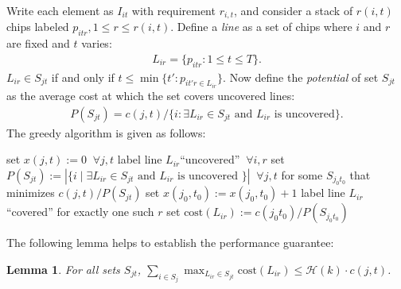 \documentclass[a4paper,11pt]{article}
\newtheorem{lemma}[theorem]{Lemma}
\begin{document}
Write each element as $I_{it}$ with requirement $r_{i, t}$, and consider a stack of $r(i, t)$ chips labeled $p_{itr}, 1 \leq r \leq r(i, t)$. Define a \emph{line} as a set of chips where $i$ and $r$ are fixed and $t$ varies:
\begin{align*}
    L_{ir} = \{ p_{itr} : 1 \leq t \leq T \}.
\end{align*}
$L_{ir} \in S_{jt}$ if and only if $t \leq \min\{ t' : p_{it'r \in L_{ir}} \}$. Now define the \emph{potential} of set $S_{jt}$ as the average cost at which the set covers uncovered lines:
\begin{align*}
    P(S_{jt}) = c(j, t) / \{ i : \exists L_{ir} \in S_{jt} \text{ and } L_{ir} \text{ is uncovered} \}.
\end{align*}
The greedy algorithm is given as follows:
\begin{algorithm}[H] {\begin{algorithmic}[1]
        \State set $x(j, t) := 0 \;\; \forall j, t$
        \State label line $L_{ir} \text{``uncovered''} \;\; \forall i, r$
            \State set $P(S_{jt}) := |\{ i \mid \exists L_{ir} \in S_{jt} \text{ and } L_{ir} \text{ is uncovered }\}| \;\; \forall j, t$
            \State for some $S_{j_0 t_0}$ that minimizes $c(j, t) / P(S_{jt})$ set $x(j_0, t_0) := x(j_0, t_0) + 1$
                    \State label line $L_{ir}$ ``covered'' for exactly one such $r$
                \EndIf
                \State set $\text{cost}(L_{ir}) := c(j_0 t_0) / P(S_{j_0 t_0})$
            \EndFor
        \EndWhile
\end{algorithmic}} \end{algorithm}
The following lemma helps to establish the performance guarantee:
\begin{lemma}
    For all sets $S_{jt}$, $\sum_{i \in S_j} \max_{L_{ir} \in S_{jt}} \text{cost}(L_{ir}) \leq \mathcal{H}(k) \cdot c(j, t)$.
\end{lemma}
\end{document}

